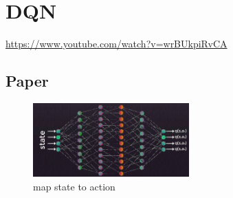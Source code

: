 \documentclass{book}
\begin{document}
\section{DQN}
\url{https://www.youtube.com/watch?v=wrBUkpiRvCA}\\
\subsection{Paper}
\begin{figure}[!htbp]
\centering
\includegraphics[width=6cm]{./res/DQN.jpg}
\caption{map state to action}
\end{figure}
\end{document}
